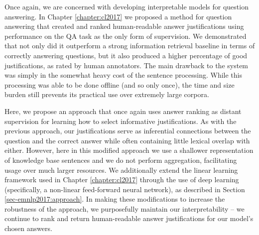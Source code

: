 
Once again, we are concerned with developing interpretable models for question answering.  In Chapter \ref{chapter:cl2017} we proposed a method for question answering that created and ranked human-readable answer justifications using performance on the QA task as the only form of supervision.  We demonstrated that not only did it outperform a strong information retrieval baseline in terms of correctly answering questions, but it also produced a higher percentage of good justifications, as rated by human annotators. The main drawback to the system was simply in the somewhat heavy cost of the sentence processing.  While this processing was able to be done offline (and so only once), the time and size burden still prevents its practical use over extremely large corpora. 

Here, we propose an approach that once again uses answer ranking as distant supervision for learning how to select informative justifications.  As with the previous approach, our justifications serve as inferential connections between the question and the correct answer while often containing little lexical overlap with either.  However, here in this  modified approach we use a  shallower representation of knowledge base sentences and we do not perform aggregation, facilitating usage over much larger resources.  
We additionally extend the linear learning framework used in Chapter \ref{chapter:cl2017} through the use of deep learning (specifically, a non-linear feed-forward neural network), as described in Section \ref{sec-emnlp2017:approach}.  
In making these modifications to increase the robustness of the approach, we purposefully maintain our interpretability -- we continue to rank and return human-readable answer justifications for our model's chosen answers.


